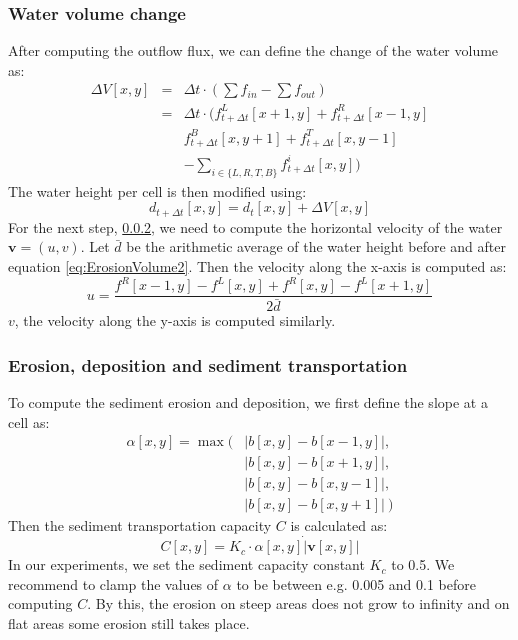 \documentclass[journal, letterpaper]{IEEEtran}
\begin{document}
\subsubsection{Water volume change}\label{Erosion3}
After computing the outflow flux, we can define the change of the water volume as:
\begin{equation}
\begin{array}{rcl}
	\Delta V[x,y] &=& \Delta t \cdot (\sum{f_{in}} - \sum{f_{out}}) \\
	              &=& \Delta t \cdot (f_{t+\Delta t}^L[x+1,y] + f_{t+\Delta t}^R[x-1,y] \\
								& & f_{t+\Delta t}^B[x,y+1] + f_{t+\Delta t}^T[x,y-1] \\
								& & - \sum_{i\in\{L,R,T,B\}}{f_{t+\Delta t}^i[x,y]} )
\end{array}
\label{eq:ErosionVolume1}
\end{equation}
The water height per cell is then modified using:
\begin{equation}
	d_{t+\Delta t}[x,y] = d_t[x,y] + \Delta V[x,y]
\label{eq:ErosionVolume2}
\end{equation}
For the next step, \ref{ErosionDeposition}, we need to compute the horizontal velocity of the water $\textbf{v}=(u,v)$.
Let $\bar{d}$ be the arithmetic average of the water height before and after equation \ref{eq:ErosionVolume2}.
Then the velocity along the x-axis is computed as:
\begin{equation}
	u = \frac{f^R[x-1,y]-f^L[x,y] + f^R[x,y]-f^L[x+1,y]}{2\bar{d}}
\label{eq:ErosionVolume3}
\end{equation}
$v$, the velocity along the y-axis is computed similarly.

\subsubsection{Erosion, deposition and sediment transportation}\label{ErosionDeposition}
To compute the sediment erosion and deposition, we first define the slope at a cell as:
\begin{equation}
\begin{array}{rl}
	\alpha[x,y] = \max(&|b[x,y]-b[x-1,y]|,\\
	                   &|b[x,y]-b[x+1,y]|,\\
										 &|b[x,y]-b[x,y-1]|,\\
										 &|b[x,y]-b[x,y+1]|\ )
\end{array}
\label{eq:ErosionSediment1}
\end{equation}
Then the sediment transportation capacity $C$ is calculated as:
\begin{equation}
	C[x,y]=K_c \cdot \alpha[x,y] \dot |\textbf{v}[x,y]|
\label{eq:ErosionSediment2}
\end{equation}
In our experiments, we set the sediment capacity constant $K_c$ to 0.5.
We recommend to clamp the values of $\alpha$ to be between e.g. 0.005 and 0.1 before computing $C$. By this, the erosion on steep areas does not grow to infinity and on flat areas some erosion still takes place.
\end{document}
